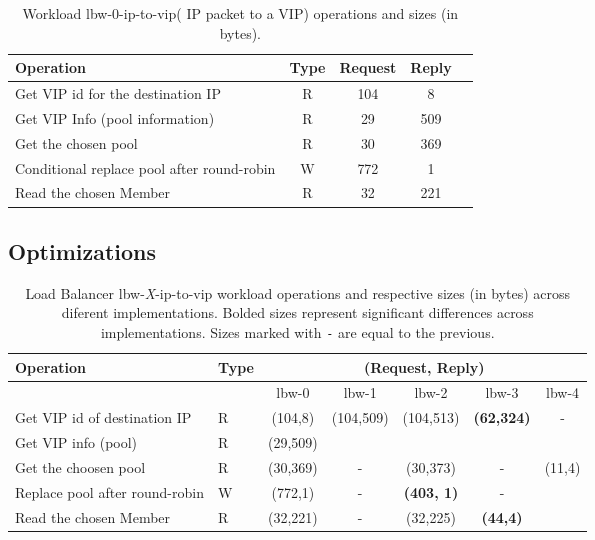 \begin{table}[ht]
\small
\centering 
\begin{tabular}{l c c c c}
 Operation & Type & Request & Reply \\ \toprule 
Get VIP id for the destination IP & R & 104 & 8\\
Get VIP Info (pool information) & R & 29 & 509\\
Get the chosen pool & R & 30 & 369\\
Conditional replace pool after round-robin & W & 772 & 1\\
Read the chosen Member & R & 32 & 221 \\ \bottomrule
\end{tabular}\caption[Workload lbw-0-ip-to-vip( IP packet to a VIP)
operations]{Workload lbw-0-ip-to-vip( IP packet to a VIP) operations
  and sizes (in bytes).}
\label{table:lbw-0-ip-to-vip}
\end{table}




\subsection{Optimizations}
\begin{table}[ht]
\small
\begin{tabular}{llccccc}
 Operation & Type &  \multicolumn{5}{c}{ (Request, Reply) } \\  \midrule
&  & lbw-0 & lbw-1  & lbw-2 & lbw-3 & lbw-4 \\ \toprule 
Get VIP id of destination IP  & R & (104,8) &\multirow{2}{*}{(104,509)} &  \multirow{2}{*}{(104,513)} &\multirow{2}{*}{\textbf{(62,324)}} & \multirow{2}{*}{-}    \\\cmidrule{1-2} 
Get VIP info (pool)   & R &  (29,509) & & & &   \\ \midrule 
Get the choosen pool  & R & (30,369)  &  - & (30,373) & -   & \multirow{3}{*}[-2mm]{(11,4)}  \\  \cmidrule{1-2} 
Replace pool after round-robin  & W & (772,1) & -
&\textbf{(403, 1)} &  - \\ \cmidrule{1-2}  
  Read the chosen Member &  R & (32,221) & - & (32,225) & \textbf{(44,4)} & \\\bottomrule  
\end{tabular}\caption[Load Balancer IP to VIP workload operations across
diferent implementations.]{Load Balancer  lbw-\textit{X}-ip-to-vip workload
  operations and respective sizes (in bytes) across diferent
  implementations. Bolded sizes represent significant differences
  across implementations. Sizes marked with \texttt{-} are equal to
  the previous. }\label{table:lbw:optimizations}
\end{table}

